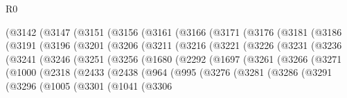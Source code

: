 \begin{lexlean}{R0}
\begin{coremodule}
        (@3142
          (@3147
            (@3151
              (@3156
                (@3161
                  (@3166
                    (@3171
                      (@3176
                        (@3181
                          (@3186
                            (@3191
                              (@3196
                                (@3201
                                  (@3206
                                    (@3211
                                      (@3216
                                        (@3221
                                          (@3226
                                            (@3231
                                              (@3236
                                                (@3241
                                                  (@3246
                                                    (@3251
                                                      (@3256
                                                        (@1680
                                                          (@2292
                                                            (@1697
                                                              (@3261
                                                                (@3266
                                                                  (@3271
                                                                    (@1000
                                                                      (@2318
                                                                        (@2433
                                                                          (@2438
                                                                            (@964
                                                                              (@995
                                                                                (@3276
                                                                                  (@3281
                                                                                    (@3286
                                                                                      (@3291
                                                                                        (@3296
                                                                                          (@1005
                                                                                            (@3301
                                                                                              (@1041
                                                                                                (@3306

\end{coremodule}
\end{lexlean}
